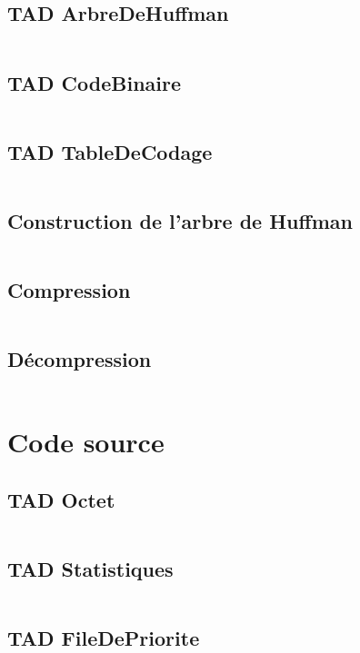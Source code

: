 \documentclass[10pt]{report}
\begin{document}
            \subsection{TAD ArbreDeHuffman}
                \inputminted[breaklines]{c}{../include/arbreDeHuffman.h}
            \subsection{TAD CodeBinaire}
                \inputminted[breaklines]{c}{../include/codeBinaire.h}
            \subsection{TAD TableDeCodage}
                \inputminted[breaklines]{c}{../include/tableDeCodage.h}
            \subsection{Construction de l'arbre de Huffman}
                \inputminted[breaklines]{c}{../include/construireArbreDeHuffman.h}
            \subsection{Compression}
                \inputminted[breaklines]{c}{../include/compression.h}
            \subsection{Décompression}
                \inputminted[breaklines]{c}{../include/decompression.h}  
        \section{Code source}
            \subsection{TAD Octet}
                \inputminted[breaklines]{c}{../src/octet.c}
            \subsection{TAD Statistiques}
                \inputminted[breaklines]{c}{../src/statistiques.c}
            \subsection{TAD FileDePriorite}
                \inputminted[breaklines]{c}{../src/fileDePrioriteDArbreDeHuffman.c}
\end{document}
